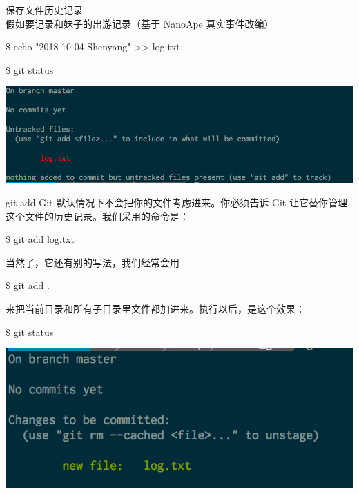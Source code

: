 \documentclass{beamer}
\begin{document}
\begin{frame}[fragile]{保存文件历史记录}
    假如要记录和妹子的出游记录（基于 NanoApe 真实事件改编）

    \$ echo "2018-10-04 Shenyang" >{}> log.txt

    \$ git status
    
    \includegraphics[width=\linewidth]{2018-10-25-09-30-24.png}
\end{frame}

\begin{frame}{git add}
    Git 默认情况下不会把你的文件考虑进来。你必须告诉 Git 让它替你管理这个文件的历史记录。我们采用的命令是：

    \$ git add log.txt

    当然了，它还有别的写法，我们经常会用

    \$ git add .

    来把当前目录和所有子目录里文件都加进来。执行以后，是这个效果：
    
    \$ git status

    \includegraphics[width=\linewidth]{2018-10-25-09-33-45.png}

\end{frame}
\end{document}
